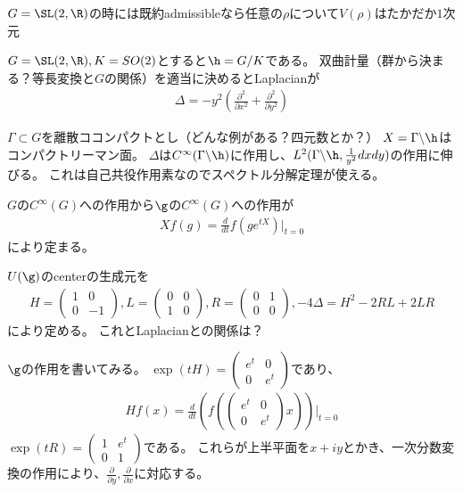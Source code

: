\documentclass{jsarticle}
\begin{document}
$G=\SL(2,\R)$の時には既約admissibleなら任意の$\rho$について$V(\rho)$はたかだか$1$次元



$G=\SL(2,\R), K=SO(2)$とすると$\h=G/K$である。
双曲計量（群から決まる？等長変換と$G$の関係）を適当に決めるとLaplacianが
\begin{align*}
\Delta=-y^2(\frac{\partial^2}{\partial x^2}+\frac{\partial^2}{\partial y^2})
\end{align*}

$\Gamma\subset G$を離散ココンパクトとし（どんな例がある？四元数とか？）
$X=\Gamma\backslash\h$はコンパクトリーマン面。
$\Delta$は$C^\infty(\Gamma\backslash\h)$に作用し、$L^2(\Gamma\backslash\h, \frac{1}{y^2}dxdy)$の作用に伸びる。
これは自己共役作用素なのでスペクトル分解定理が使える。

$G$の$C^\infty(G)$への作用から$\g$の$C^\infty(G)$への作用が
\begin{align*}
Xf(g)=\frac{d}{dt}f(ge^{tX})\vert_{t=0}
\end{align*}
により定まる。

$U(\g)$のcenterの生成元を
\begin{align*}
H=\begin{pmatrix}1&0\\0&-1\end{pmatrix},
L=\begin{pmatrix}0&0\\1&0\end{pmatrix},
R=\begin{pmatrix}0&1\\0&0\end{pmatrix},
-4\Delta=H^2-2RL+2LR
\end{align*}
により定める。
これとLaplacianとの関係は？

$\g$の作用を書いてみる。
$\exp(tH)=\begin{pmatrix}e^t&0\\0&e^t\end{pmatrix}$であり、
\begin{align*}
Hf(x)=\frac{d}{dt}(f(\begin{pmatrix}e^t&0\\0&e^t\end{pmatrix}x))\vert_{t=0}
\end{align*}
$\exp(tR)=\begin{pmatrix}1&e^t\\0&1\end{pmatrix}$である。
これらが上半平面を$x+iy$とかき、一次分数変換の作用により、$\frac{\partial}{\partial y}, \frac{\partial}{\partial x}$に対応する。
\end{document}
